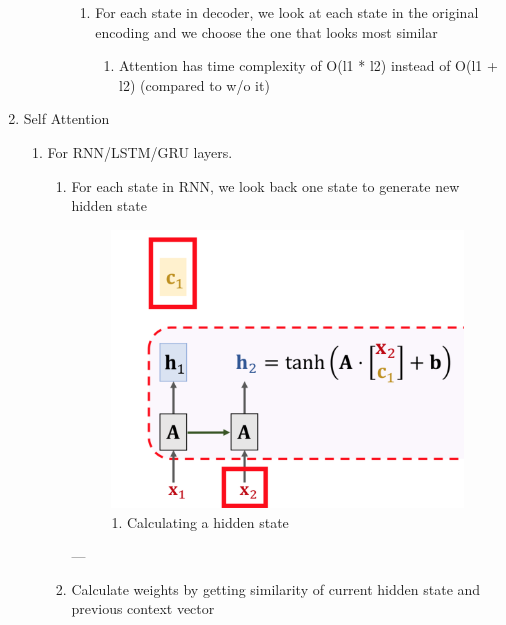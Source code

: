\documentclass[11pt]{article}
\begin{document}
\begin{enumerate}
\begin{enumerate}
\begin{enumerate}
\begin{enumerate}
\item For each state in decoder, we look at each state in the original encoding and we choose the one that looks most similar
\begin{enumerate}
\item Attention has time complexity of O(l1 * l2) instead of O(l1 + l2) (compared to w/o it)
\end{enumerate}
\end{enumerate}
\end{enumerate}
\end{enumerate}
\item Self Attention
\begin{enumerate}
\item For RNN/LSTM/GRU layers.
\begin{enumerate}
\item For each state in RNN, we look back one state to generate new hidden state

\begin{figure}[ht!]
\centering
\includegraphics[width=15cm]{./pictures/calc_hidden_state.png}
\caption{\label{fig:org0c482be}
1. Calculating a hidden state}
\end{figure}

---

\item Calculate weights by getting similarity of current hidden state and previous context vector


\end{enumerate}
\end{enumerate}
\end{enumerate}
\end{document}

